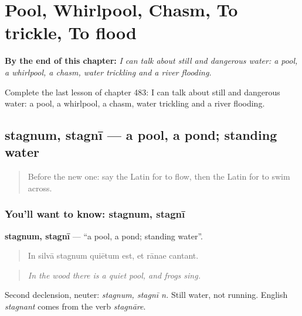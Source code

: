 
\chapter{Pool, Whirlpool, Chasm, To trickle, To flood}
\label{ch:la-pool-whirlpool-chasm-to-trickle-to-flood}

\begin{chapteropening}
\textbf{By the end of this chapter:} \emph{I can talk about still and dangerous water: a pool, a whirlpool, a chasm, water trickling and a river flooding.}

Complete the last lesson of chapter 483: I can talk about still and dangerous water: a pool, a whirlpool, a chasm, water trickling and a river flooding.
\end{chapteropening}

\section[stagnum, stagnī]{stagnum, stagnī — a pool, a pond; standing water}

\label{lesson:LA-C483-stagnum}



\begin{quote}
Before the new one: say the Latin for to flow, then the Latin for to swim across.
\end{quote}

\subsection*{You'll want to know: stagnum, stagnī}
\textbf{stagnum, stagnī} — \textquotedblleft{}a pool, a pond; standing water\textquotedblright{}.

\begin{quote}
In silvā stagnum quiētum est, et rānae cantant.
\end{quote}

\begin{quote}
\emph{In the wood there is a quiet pool, and frogs sing.}
\end{quote}

Second declension, neuter: \emph{stagnum, stagnī n.} Still water, not running. English \emph{stagnant} comes from the verb \emph{stagnāre}.


